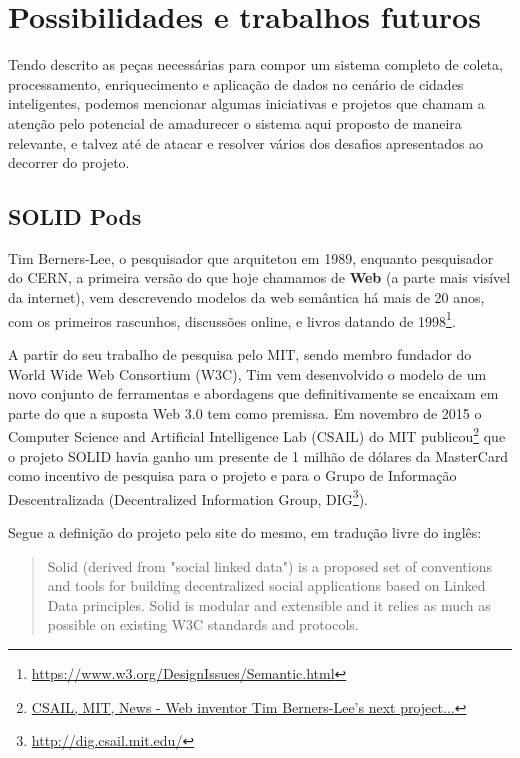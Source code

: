 \chapter{Possibilidades e trabalhos futuros}

Tendo descrito as peças necessárias para compor um sistema completo de coleta, processamento, enriquecimento e aplicação de dados no cenário de cidades inteligentes, podemos mencionar algumas iniciativas e projetos que chamam a atenção pelo potencial de amadurecer o sistema aqui proposto de maneira relevante, e talvez até de atacar e resolver vários dos desafios apresentados ao decorrer do projeto.

\section{SOLID Pods}

Tim Berners-Lee, o pesquisador que arquitetou em 1989, enquanto pesquisador do CERN, a primeira versão do que hoje chamamos de \textbf{Web} (a parte mais visível da internet), vem descrevendo modelos da web semântica há mais de 20 anos, com os primeiros rascunhos, discussões online, e livros \cite{berners2001weaving} datando de 1998\footnote{\url{https://www.w3.org/DesignIssues/Semantic.html}}.

A partir do seu trabalho de pesquisa pelo MIT, sendo membro fundador do World Wide Web Consortium (W3C), Tim vem desenvolvido o modelo de um novo conjunto de ferramentas e abordagens que definitivamente se encaixam em parte do que a suposta Web 3.0 tem como premissa. Em novembro de 2015 o Computer Science and Artificial Intelligence Lab (CSAIL) do MIT publicou\footnote{\href{https://www.csail.mit.edu/news/web-inventor-tim-berners-lees-next-project-platform-gives-users-control-their-data}{CSAIL, MIT, News - Web inventor Tim Berners-Lee's next project...}} que o projeto SOLID havia ganho um presente de 1 milhão de dólares da MasterCard como incentivo de pesquisa para o projeto e para o Grupo de Informação Descentralizada (Decentralized Information Group, DIG\footnote{\url{http://dig.csail.mit.edu/}}).

Segue a definição do projeto pelo site do mesmo, em tradução livre do inglês:

\begin{quote}
    Solid (derived from "social linked data") is a proposed set of conventions and tools for building decentralized social applications based on Linked Data principles. Solid is modular and extensible and it relies as much as possible on existing W3C standards and protocols.
\end{quote}


